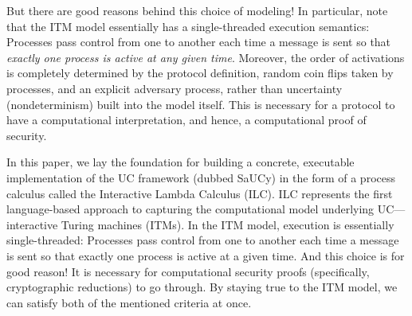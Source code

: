 But there are good reasons behind this choice of modeling! In particular, note
that the ITM model essentially has a single-threaded execution semantics:
Processes pass control from one to another each time a message is sent so that
\emph{exactly one process is active at any given time}. Moreover, the order of
activations is completely determined by the protocol definition, random coin
flips taken by processes, and an explicit adversary process, rather than
uncertainty (nondeterminism) built into the model itself. This is necessary for
a protocol to have a computational interpretation, and hence, a computational
proof of security.



 In this paper, we lay the foundation for building a
concrete, executable implementation of the UC framework (dubbed SaUCy) in the
form of a process calculus called the Interactive Lambda Calculus (ILC). ILC
represents the first language-based approach to capturing the computational
model underlying UC---interactive Turing machines (ITMs). In the ITM model,
execution is essentially single-threaded: Processes pass control from one to
another each time a message is sent so that exactly one process is active at a
given time. And this choice is for good reason! It is necessary for
computational security proofs (specifically, cryptographic reductions) to go
through. By staying true to the ITM model, we can satisfy both of the mentioned
criteria at once.

